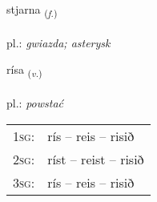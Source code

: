 \documentclass[frontgrid, backgrid]{flacards}\usepackage[]{graphicx}\usepackage[]{xcolor}
\begin{document}
\renewcommand{\flhead}{\vskip5pt \fboxsep=0pt {\small\bfseries\footnotesize Nafnorð | Noun}}
\renewcommand{\fcfoot}{\vskip5pt \fboxsep=0pt \hspace{2pt}{\small\bfseries\footnotesize 2K}}

\renewcommand{\blhead}{\vskip5pt {\small\bfseries\footnotesize Nafnorð | Noun }}
\renewcommand{\bcfoot}{\vskip5pt \hspace{2pt}{\small\bfseries\footnotesize 2K}}


{stjarna \small{\textsubscript{(\textit{f.})}} \\[1ex] %
\textphonetic{[stjartna]} \\
pl.: \emph{gwiazda; asterysk} \\  [2ex]
\renewcommand*{\arraystretch}{0.8}
}

\renewcommand{\flhead}{\vskip5pt \fboxsep=0pt {\small\bfseries\footnotesize Sagnorð | Verb}}
\renewcommand{\fcfoot}{\vskip5pt \fboxsep=0pt \hspace{2pt}{\small\bfseries\footnotesize 2K}}

\renewcommand{\blhead}{\vskip5pt {\small\bfseries\footnotesize Sagnorð | Verb }}
\renewcommand{\bcfoot}{\vskip5pt \hspace{2pt}{\small\bfseries\footnotesize 2K}}


{rísa \small{\textsubscript{(\textit{v.})}} \\[1ex] %
\textphonetic{[riːsa]} \\
pl.: \emph{powstać} \\  [2ex]
\renewcommand*{\arraystretch}{0.8}
\begin{tabular}{p{1cm}l}
\textsc{1sg}: & rís -- reis -- risið \\ 
\textsc{2sg}: & ríst -- reist -- risið \\ 
\textsc{3sg}: & rís -- reis -- risið \\ 
\end{tabular}
}
\end{document}
